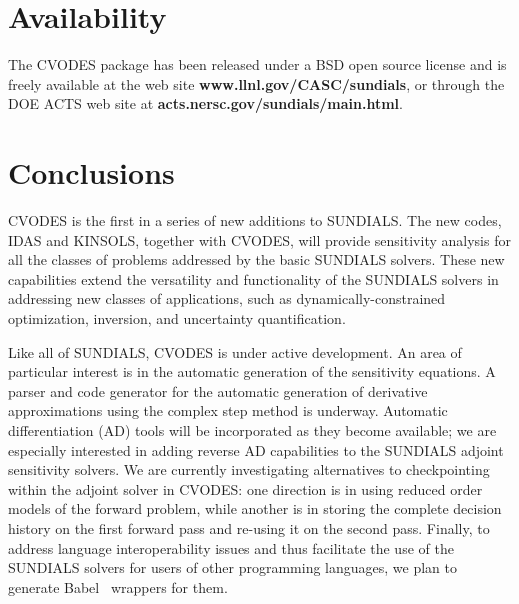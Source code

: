 \section{Availability}\label{s:availability}

The CVODES package has been released under a BSD open source license and is 
freely available at the web site
{\bf www.llnl.gov/CASC/sundials},
or through the DOE ACTS web site at
{\bf acts.nersc.gov/sundials/main.html}.

\section{Conclusions}\label{s:conclusions}

CVODES is the first in a series of new additions to SUNDIALS. The new codes,
IDAS and KINSOLS, together with CVODES, will provide sensitivity analysis
for all the classes of problems addressed by the basic SUNDIALS solvers.
These new capabilities extend the versatility and functionality of the SUNDIALS
solvers in addressing new classes of applications, such as dynamically-constrained
optimization, inversion, and uncertainty quantification.

Like all of SUNDIALS, CVODES is under active development.
An area of particular interest is in the automatic generation of the
sensitivity equations. A parser and code generator for the automatic
generation of derivative approximations using the complex step method
is underway.
Automatic differentiation (AD) tools will be incorporated as they
become available; we are especially interested in adding reverse AD
capabilities to the SUNDIALS adjoint sensitivity solvers.
We are currently investigating alternatives to checkpointing within
the adjoint solver in CVODES: one direction is in using reduced order
models of the forward problem, while another is in storing the
complete decision history on the first forward pass and re-using it on
the second pass.
Finally, to address language interoperability issues and thus
facilitate the use of the SUNDIALS solvers for users of other
programming languages, we plan to generate Babel~\cite{KKPR:01}
wrappers for them.
 
